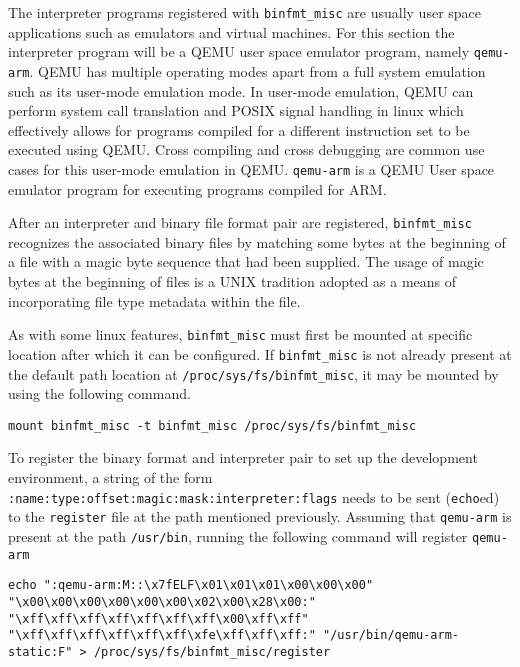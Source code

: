 The interpreter programs registered with \texttt{binfmt\_misc} are usually user space applications such as emulators and virtual machines. For this section the interpreter program will be a QEMU user space emulator program, namely \texttt{qemu-arm}. QEMU has multiple operating modes apart from a full system emulation such as its user-mode emulation mode. In user-mode emulation, QEMU can perform system call translation and POSIX signal handling in linux which effectively allows for programs compiled for a different instruction set to be executed using QEMU. Cross compiling and cross debugging are common use cases for this user-mode emulation in QEMU. \texttt{qemu-arm} is a QEMU User space emulator program for executing programs compiled for ARM.

After an interpreter and binary file format pair are registered, \texttt{binfmt\_misc} recognizes the associated binary files by matching some bytes at the beginning of a file with a magic byte sequence that had been supplied. The usage of magic bytes at the beginning of files is a UNIX tradition adopted as a means of incorporating file type metadata within the file.

As with some linux features, \texttt{binfmt\_misc} must first be mounted at specific location after which it can be configured. If \texttt{binfmt\_misc} is not already present at the default path location at \texttt{/proc/sys/fs/binfmt\_misc}, it may be mounted by using the following command.

\begin{verbatim}
mount binfmt_misc -t binfmt_misc /proc/sys/fs/binfmt_misc
\end{verbatim}

To register the binary format and interpreter pair to set up the development environment, a string of the form \texttt{:name:type:offset:magic:mask:interpreter:flags} needs to be sent (\texttt{echo}ed) to the \texttt{register} file at the path mentioned previously. Assuming that \texttt{qemu-arm} is present at the path \texttt{/usr/bin}, running the following command will register \texttt{qemu-arm}

\begin{verbatim}
echo ":qemu-arm:M::\x7fELF\x01\x01\x01\x00\x00\x00" "\x00\x00\x00\x00\x00\x00\x02\x00\x28\x00:" "\xff\xff\xff\xff\xff\xff\xff\x00\xff\xff" "\xff\xff\xff\xff\xff\xff\xfe\xff\xff\xff:" "/usr/bin/qemu-arm-static:F" > /proc/sys/fs/binfmt_misc/register
\end{verbatim}

